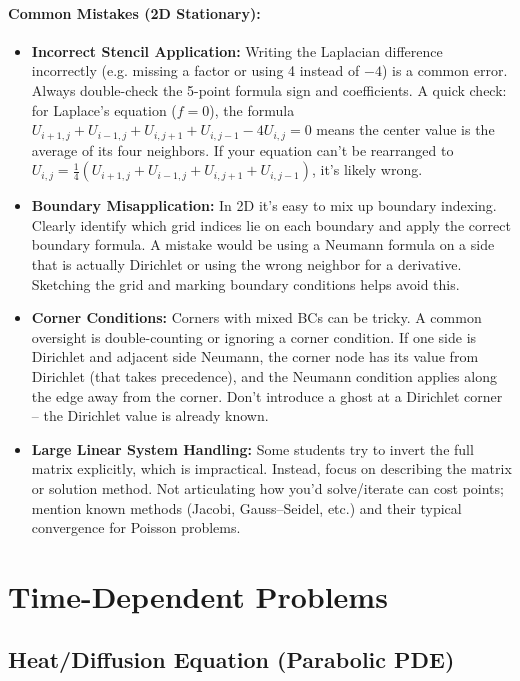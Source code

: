 \documentclass[a4paper,11pt]{report}
\begin{document}
\paragraph{Common Mistakes (2D Stationary):}
\begin{itemize}
    \item \textbf{Incorrect Stencil Application:} Writing the Laplacian difference incorrectly (e.g. missing a factor or using 4 instead of $-4$) is a common error. Always double-check the 5-point formula sign and coefficients. A quick check: for Laplace’s equation ($f=0$), the formula $U_{i+1,j}+U_{i-1,j}+U_{i,j+1}+U_{i,j-1}-4U_{i,j}=0$ means the center value is the average of its four neighbors\cite{leifh}. If your equation can’t be rearranged to $U_{i,j} = \frac{1}{4}(U_{i+1,j}+U_{i-1,j}+U_{i,j+1}+U_{i,j-1})$, it’s likely wrong.
    \item \textbf{Boundary Misapplication:} In 2D it’s easy to mix up boundary indexing. Clearly identify which grid indices lie on each boundary and apply the correct boundary formula. A mistake would be using a Neumann formula on a side that is actually Dirichlet or using the wrong neighbor for a derivative. Sketching the grid and marking boundary conditions helps avoid this.
    \item \textbf{Corner Conditions:} Corners with mixed BCs can be tricky. A common oversight is double-counting or ignoring a corner condition. If one side is Dirichlet and adjacent side Neumann, the corner node has its value from Dirichlet (that takes precedence), and the Neumann condition applies along the edge away from the corner. Don’t introduce a ghost at a Dirichlet corner -- the Dirichlet value is already known.
    \item \textbf{Large Linear System Handling:} Some students try to invert the full matrix explicitly, which is impractical. Instead, focus on describing the matrix or solution method. Not articulating how you’d solve/iterate can cost points; mention known methods (Jacobi, Gauss--Seidel, etc.) and their typical convergence for Poisson problems.
\end{itemize}

\section{Time-Dependent Problems}

\subsection{Heat/Diffusion Equation (Parabolic PDE)}
\end{document}
